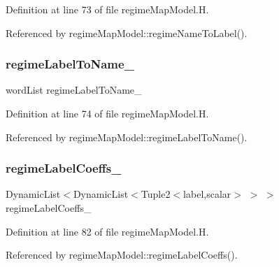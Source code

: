 Definition at line 73 of file regime\+Map\+Model.\+H.



Referenced by regime\+Map\+Model\+::regime\+Name\+To\+Label().

\mbox{\label{classFoam_1_1regimeMapModel_a0eb03bea6278f16e3d0c8e61448ca869}} 
\subsubsection{\texorpdfstring{regime\+Label\+To\+Name\+\_\+}{regimeLabelToName\_}}
{\footnotesize\ttfamily word\+List regime\+Label\+To\+Name\+\_\+\hspace{0.3cm}{\ttfamily [protected]}}



Definition at line 74 of file regime\+Map\+Model.\+H.



Referenced by regime\+Map\+Model\+::regime\+Label\+To\+Name().

\mbox{\label{classFoam_1_1regimeMapModel_a4abafec3410292daed9d27a25787f03f}} 
\subsubsection{\texorpdfstring{regime\+Label\+Coeffs\+\_\+}{regimeLabelCoeffs\_}}
{\footnotesize\ttfamily Dynamic\+List$<$Dynamic\+List$<$Tuple2$<$label,scalar$>$ $>$ $>$ regime\+Label\+Coeffs\+\_\+\hspace{0.3cm}{\ttfamily [protected]}}



Definition at line 82 of file regime\+Map\+Model.\+H.



Referenced by regime\+Map\+Model\+::regime\+Label\+Coeffs().




